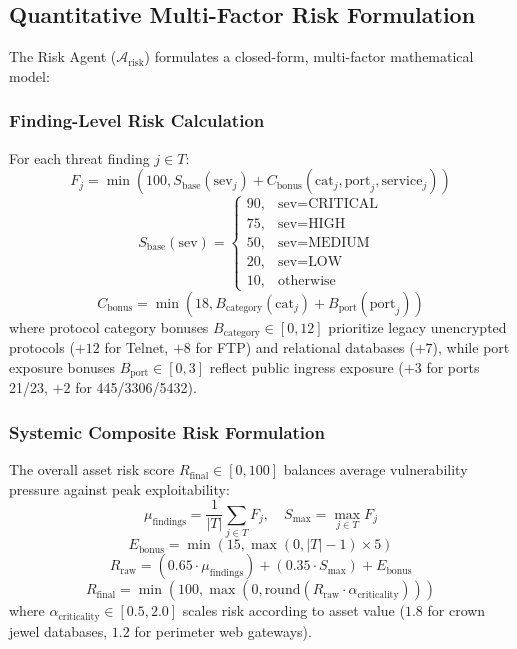 \documentclass[conference]{IEEEtran}
\begin{document}
\subsection{Quantitative Multi-Factor Risk Formulation}
The Risk Agent ($\mathcal{A}_{\text{risk}}$) formulates a closed-form, multi-factor mathematical model:

\subsubsection{Finding-Level Risk Calculation}
For each threat finding $j \in T$:
\begin{equation}
F_j = \min\left(100, S_{\text{base}}(\text{sev}_j) + C_{\text{bonus}}(\text{cat}_j, \text{port}_j, \text{service}_j)\right)
\end{equation}
\begin{equation}
S_{\text{base}}(\text{sev}) = \begin{cases} 
90, & \text{sev} = \text{CRITICAL} \\ 
75, & \text{sev} = \text{HIGH} \\ 
50, & \text{sev} = \text{MEDIUM} \\ 
20, & \text{sev} = \text{LOW} \\ 
10, & \text{otherwise} 
\end{cases}
\end{equation}
\begin{equation}
C_{\text{bonus}} = \min\left(18, B_{\text{category}}(\text{cat}_j) + B_{\text{port}}(\text{port}_j)\right)
\end{equation}
where protocol category bonuses $B_{\text{category}} \in [0, 12]$ prioritize legacy unencrypted protocols ($+12$ for Telnet, $+8$ for FTP) and relational databases ($+7$), while port exposure bonuses $B_{\text{port}} \in [0, 3]$ reflect public ingress exposure ($+3$ for ports 21/23, $+2$ for 445/3306/5432).

\subsubsection{Systemic Composite Risk Formulation}
The overall asset risk score $R_{\text{final}} \in [0, 100]$ balances average vulnerability pressure against peak exploitability:
\begin{equation}
\mu_{\text{findings}} = \frac{1}{|T|} \sum_{j \in T} F_j, \quad S_{\max} = \max_{j \in T} F_j
\end{equation}
\begin{equation}
E_{\text{bonus}} = \min\left(15, \max(0, |T| - 1) \times 5\right)
\end{equation}
\begin{equation}
R_{\text{raw}} = \left(0.65 \cdot \mu_{\text{findings}}\right) + \left(0.35 \cdot S_{\max}\right) + E_{\text{bonus}}
\end{equation}
\begin{equation}
R_{\text{final}} = \min\left(100, \max\left(0, \text{round}\left(R_{\text{raw}} \cdot \alpha_{\text{criticality}}\right)\right)\right)
\end{equation}
where $\alpha_{\text{criticality}} \in [0.5, 2.0]$ scales risk according to asset value ($1.8$ for crown jewel databases, $1.2$ for perimeter web gateways).
\end{document}
